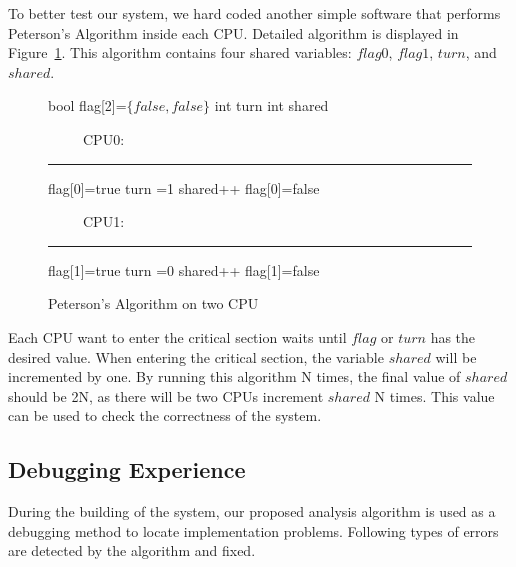 \documentclass[12pt,frontmatter,copyright,thesis]{usfmanus}
\let\oldnl\nl%
\newcommand{\nonl}{\renewcommand{\nl}{\let\nl\oldnl}}%
\newcommand{\rememberlines}{\xdef\rememberedlines{\number\value{AlgoLine}}}
\newcommand{\resumenumbering}{\setcounter{AlgoLine}{\rememberedlines}}
\begin{document}
To better 
test our system, we hard coded another simple software that performs Peterson's Algorithm
inside each CPU. Detailed algorithm is displayed in Figure~\ref{petersons}. 
This algorithm contains four shared variables: $flag0$, $flag1$, $turn$, and $shared$.
\begin{figure}[h]
\begin{algorithm}[H]
\DontPrintSemicolon
bool flag[2]=$\{false,false\}$\;
int turn\;
int shared\;
\rememberlines
\end{algorithm}

\begin{minipage}{.5\textwidth}
\begin{algorithm}[H]
\resumenumbering
\DontPrintSemicolon
\nonl \ \ \ \ \ CPU0:\;
\hrule
flag[0]=true\;
turn =1 \;
shared++\;
flag[0]=false\;
\end{algorithm}
\end{minipage}%
{\LinesNumberedHidden
\begin{minipage}{0.5\textwidth}
\begin{algorithm}[H]
\DontPrintSemicolon
\ \ \ \ \ CPU1:\;
\hrule
flag[1]=true\;
turn =0 \;
shared++\;
flag[1]=false\;
\end{algorithm}

\end{minipage}
}
\label{petersons}
\caption{Peterson's Algorithm on two CPU}
\end{figure}
Each CPU want to enter the critical section waits until $flag$ or $turn$ has 
the desired value. When entering the critical section, the variable $shared$ will
be incremented by one.
By running this algorithm N times, the final value of $shared$ should
be 2N, as there will be two CPUs increment $shared$ N times. This
value can be used to check the correctness of the system.
\clearpage
\subsection{Debugging Experience}
During the building of the system, our proposed analysis algorithm
is used as a debugging method to locate implementation problems. Following types of errors
are detected by the algorithm and fixed.
\end{document}
